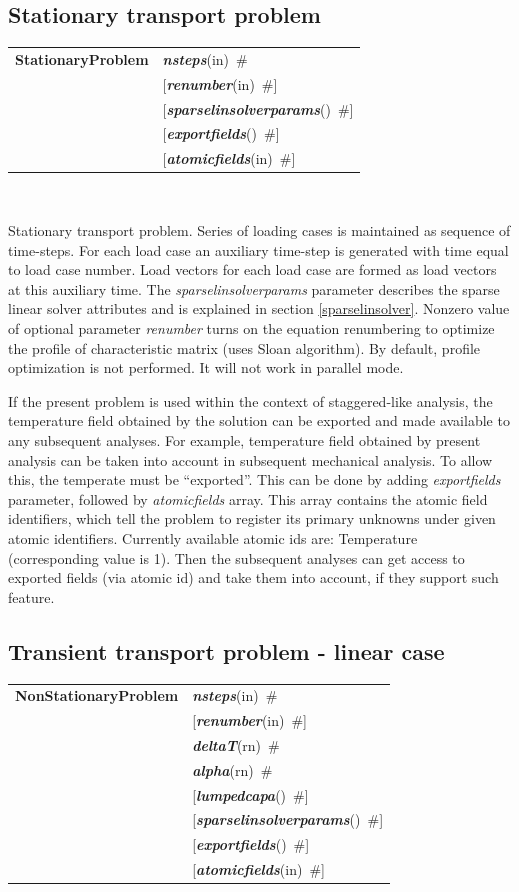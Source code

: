 \documentclass[a4paper]{article}
\makeatletter
\newcommand{\param}[1]{{\em #1}}
\newcommand{\keywordnotype}[1]{\mbox{{\it{\bf{#1}}}}}
\newcommand{\keyword}[2]{\mbox{{\keywordnotype{#1}\tiny (#2)}}}
\newcommand{\entKeywordInst}[1]{\mbox{{\bf{{#1}}}}}
\newcommand{\field}[2]{\mbox{\keyword{#1}{#2}~\#}}
\newcommand{\optField}[2]{\mbox{[\field{#1}{#2}]}}
\newenvironment{record}[1][]{\begin{tabular}{|ll}}{\end{tabular}\\}
\newcommand{\recentry}[2]{{#1}&{#2}\\}
\newcounter{rcc}
\newenvironment{record}[1][\textwidth]{\setcounter{rcc}{0}\begin{tabular*}{#1}{|ll@{\extracolsep{\fill}}r}}{\end{tabular*}\\}
\newcommand{\recentry}[2]{\ifthenelse{\value{rcc}>0}{&$\backslash$ \\}{\setcounter{rcc}{1}}{#1}&{#2}}
\makeatother
\begin{document}
\subsection{Stationary transport problem}
\label{StationaryTransport}

\begin{record}
\recentry{\entKeywordInst{StationaryProblem}}{\field{nsteps}{in}}
\recentry{}{\optField{renumber}{in}} \recentry{}{\optField{sparselinsolverparams}{}}
\recentry{}{\optField{exportfields}{}} \recentry{}{\optField{atomicfields}{in}}
\end{record}

Stationary transport problem. 
Series of loading cases is maintained as sequence of time-steps.
For each load case an auxiliary time-step is generated with time
equal to load case number.
Load vectors for each load case are formed as load vectors at
this auxiliary time.
The  \param{sparselinsolverparams} parameter describes the sparse
linear solver attributes and is explained in section \ref{sparselinsolver}.
Nonzero value of optional parameter \param{renumber} turns on the
equation renumbering to optimize the profile of characteristic matrix
(uses Sloan algorithm). By default, profile optimization is not
performed. It will not work in parallel mode.

If the present problem is used within the context
of staggered-like analysis, the temperature field obtained by the
solution can be exported and made available to any subsequent
analyses. For example, temperature field obtained by present analysis
can be taken into account in subsequent mechanical analysis.
To allow this, the temperate must be ``exported''. This can be done
by adding \param{exportfields} parameter, followed by
\param{atomicfields} array. This array contains the atomic field
identifiers, which tell the problem to register its primary unknowns
under given atomic identifiers. Currently available atomic ids are:
Temperature (corresponding value is 1).
Then the subsequent analyses can get access to exported fields (via
atomic id) and take them into account, if they support such feature.

\subsection{Transient transport problem - linear case}
\label{LinearTransientTransport}

\begin{record}
\recentry{\entKeywordInst{NonStationaryProblem}}{\field{nsteps}{in}}
\recentry{}{\optField{renumber}{in}} \recentry{}{\field{deltaT}{rn}} \recentry{}{\field{alpha}{rn}}
\recentry{}{\optField{lumpedcapa}{}} \recentry{}{\optField{sparselinsolverparams}{}}
\recentry{}{\optField{exportfields}{}} \recentry{}{\optField{atomicfields}{in}}
\end{record}
\end{document}
